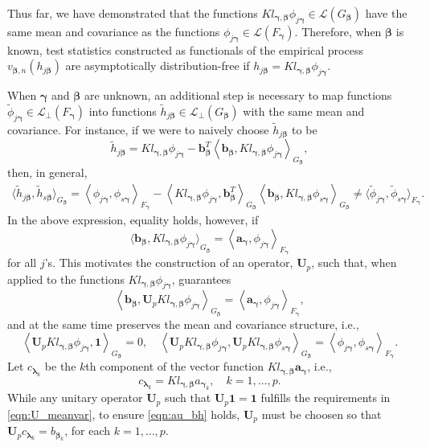 \documentclass[11pt]{article}
\newcommand{\vect}[1]{\boldsymbol{#1}}
\newcommand{\inner}[1]{\left\langle #1 \right\rangle}
\newcommand{\phj}{\phi_{j\vect{\gamma}}}
\newcommand{\phs}{\phi_{s\vect{\gamma}}}
\newcommand{\tphj}{\widetilde{\phi}_{j\vect{\gamma}}}
\newcommand{\tphs}{\widetilde{\phi}_{s\vect{\gamma}}}
\newcommand{\thj}{\widetilde{h}_{j\vect{\beta}}}
\newcommand{\ths}{\widetilde{h}_{s\vect{\beta}}}
\begin{document}
Thus far, we have demonstrated that the functions $K l_{\vect{\gamma},\vect{\beta}} \phj\in \mathcal{L}(G_{\vect{\beta}})$ have the same mean and covariance as the functions $\phj\in \mathcal{L}(F_{\vect{\gamma}})$. Therefore, when  $\vect{\beta}$ is known, test statistics constructed as functionals of the empirical process $v_{\vect{\beta},n}(h_{j\vect{\beta}})$  are asymptotically distribution-free if  $h_{j\vect{\beta}} = K l_{\vect{\gamma},\vect{\beta}} \phj$. 

When $\vect{\gamma}$ and $\vect{\beta}$ are unknown, an additional step is necessary to map functions $\tphj\in \mathcal{L}_\perp(F_{\vect \gamma})$ into functions $\thj\in \mathcal{L}_\perp(G_{\vect \beta})$ with the same mean and covariance. For instance, if we were to naively choose $\thj$ to be 
$$\thj= K l_{\vect{\gamma},\vect{\beta}} \phj -\vect{b}^T_{\vect{\beta}}\inner{\vect{b}_{\vect{\beta}},K l_{\vect{\gamma},\vect{\beta}} \phj}_{G_{\vect{\beta}}}, $$ 
then, in general,
\begin{equation*}
\begin{aligned}
\langle \thj, \ths \rangle_{G_{\vect{\beta}}}= \inner{ \phj, \phs}_{F_{\vect{\gamma}}} - \inner{  K l_{\vect{\gamma},\vect{\beta}}\phj, \vect{b}^T_{\vect{\beta}}}_{G_{\vect{\beta}}}\inner{ \vect{b}_{\vect{\beta}}, K l_{\vect{\gamma},\vect{\beta}} \phs}_{G_{\vect{\beta}}} 
\neq
\langle\tphj,\tphs\rangle_{F_{\vect{\gamma}}}. \end{aligned}
\end{equation*}
In the above expression, equality holds, however, if 
$$\big\langle{ \vect{b}_{\vect{\beta}}, K l_{\vect{\gamma},\vect{\beta}}\phj\big\rangle}_{G_{\vect{\beta}}}  = \inner{\vect{a}_{\vect{\gamma}},\phj}_{F_{\vect{\gamma}}}$$
for all $j$'s.
This motivates the construction of an operator, $\vect{U}_p$, such that, when applied to the functions $K l_{\vect{\gamma},\vect{\beta}} \phj$, guarantees
\begin{equation} \label{eqn:au_bh}
\inner{ \vect{b}_{\vect{\beta}}, \vect{U}_p K l_{\vect{\gamma},\vect{\beta}}\phj}_{G_{\vect{\beta}}} = \inner{\vect{a}_{\vect{\gamma}},\phj}_{F_{\vect{\gamma}}}, 
\end{equation}
and at the same time preserves the mean and covariance structure, i.e., 
\begin{equation} \label{eqn:U_meanvar}
\inner{\vect{U}_p K l_{\vect{\gamma},\vect{\beta}}\phj, \vect{1}}_{G_{\vect{\beta}}} = 0, \quad \inner{\vect{U}_p K l_{\vect{\gamma},\vect{\beta}} \phj, \vect{U}_p K l_{\vect{\gamma},\vect{\beta}}\phs}_{G_{\vect{\beta}}} = \inner{\phj,\phs}_{F_{\vect{\gamma}}}.
\end{equation}
Let $c_{\vect{\lambda}_k}$ be the $k$th component of the vector  function $K l_{\vect{\gamma},\vect{\beta}} \vect{a}_{\vect{\gamma}}$, i.e., 
$$c_{\vect{\lambda}_k} = K l_{\vect{\gamma},\vect{\beta}} a_{\vect{\gamma}_k}, \quad k=1,\dots,p.$$
While any unitary operator $\vect{U}_p$ such that $\vect{U}_p\vect{1}=\vect{1}$ fulfills the requirements in \eqref{eqn:U_meanvar}, to ensure \eqref{eqn:au_bh} holds,  $\vect{U}_p$ must be choosen so that  $\vect{U}_pc_{\vect{\lambda}_k}=b_{\vect{\beta}_k}$, for each $k=1,\dots,p$. 
\end{document}
